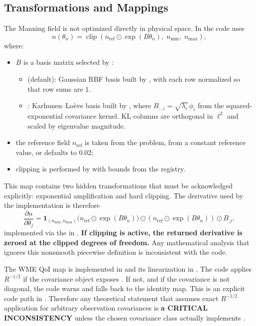 \documentclass[11pt]{article}
\begin{document}
\subsection{Transformations and Mappings}
The Manning field is not optimized directly in physical space. In  the code uses
\[
n(\theta_n) = \operatorname{clip}\!\left(n_{\mathrm{ref}} \odot \exp(B\theta_n),\; n_{\min},\; n_{\max}\right),
\]
where:
\begin{itemize}
\item $B$ is a basis matrix selected by :
  \begin{itemize}
  \item {} (default): Gaussian RBF basis built by , with each row normalized so that row sums are $1$.
  \item {}: Karhunen--Lo\`eve basis built by , where $B_{:,i} = \sqrt{\lambda_i}\,\phi_i$ from the squared-exponential covariance kernel. KL columns are orthogonal in $\ell^2$ and scaled by eigenvalue magnitude.
  \end{itemize}
\item the reference field $n_{\mathrm{ref}}$ is taken from the problem, from a constant reference value, or defaults to $0.02$;
\item clipping is performed by  with bounds from the registry.
\end{itemize}
This map contains two hidden transformations that must be acknowledged explicitly: exponential amplification and hard clipping. The derivative used by the implementation is therefore
\[
\frac{\partial n}{\partial \theta_j}
= \mathbf{1}_{(n_{\min},n_{\max})}\!\bigl(n_{\mathrm{ref}} \odot \exp(B\theta_n)\bigr)
\odot
\left(n_{\mathrm{ref}} \odot \exp(B\theta_n)\right)
\odot B_{\cdot j},
\]
implemented via the  in . \textbf{If clipping is active, the returned derivative is zeroed at the clipped degrees of freedom.} Any mathematical analysis that ignores this nonsmooth piecewise definition is inconsistent with the code.

The WME QoI map is implemented in  and its linearization in . The code applies $R^{-1/2}$ if the covariance object exposes . If not, and if the covariance is not diagonal, the code warns and falls back to the identity map. This is an explicit code path in . Therefore any theoretical statement that assumes exact $R^{-1/2}$ application for arbitrary observation covariances is \textbf{a CRITICAL INCONSISTENCY} unless the chosen covariance class actually implements .
\end{document}
